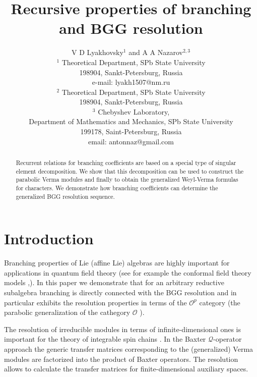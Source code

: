 \documentclass[12pt]{article}
\theoremstyle{definition}
\begin{document}
\title{Recursive properties of branching and BGG resolution}
\author{V D Lyakhovsky$^1$ and A A Nazarov$^{2,3}$\\
{\small $^1$ Theoretical Department, SPb State University}\\
{\small 198904, Sankt-Petersburg, Russia}\\
{\small e-mail: lyakh1507@nm.ru}\\
{\small $^2$ Theoretical Department, SPb State University}\\
{\small 198904, Sankt-Petersburg, Russia}\\
{\small$^{3}$ Chebyshev Laboratory,}\\
{\small Department of Mathematics and Mechanics, SPb State University}\\
{\small 199178, Saint-Petersburg, Russia}\\
{\small email: antonnaz@gmail.com}}

\maketitle

\begin{abstract}
Recurrent relations for branching coefficients are based on a special type
of singular element decomposition. We show that this decomposition can be
used to construct the parabolic Verma modules and finally to obtain the
generalized Weyl-Verma formulas for characters. We demonstrate how branching coefficients can determine the generalized BGG resolution sequence.
\end{abstract}


\section{Introduction}

\label{sec:introduction}

Branching properties of Lie (affine Lie) algebras are highly important for
applications in quantum field theory (see for example the conformal field
theory models \cite{difrancesco1997cft},\cite{coquereaux2008conformal}). In
this paper we demonstrate that for an arbitrary reductive subalgebra
branching is directly connected with the BGG resolution and in particular
exhibits the resolution properties in terms of the $\mathcal{O}^{p}$
category \cite{lepowsky1977generalization} (the parabolic generalization of
the cathegory $\mathcal{O}$ \cite{bernstein1976category}).

The resolution of irreducible modules in terms of infinite-dimensional ones is important for the
theory of integrable spin chains \cite{derk1008}. In the Baxter $\mathcal{Q}$-operator approach \cite{derk09} the generic transfer
matrices corresponding to the (generalized) Verma modules are factorized into the product of Baxter
operators. The resolution allows to calculate the transfer matrices for finite-dimensional
auxiliary spaces.
\end{document}
